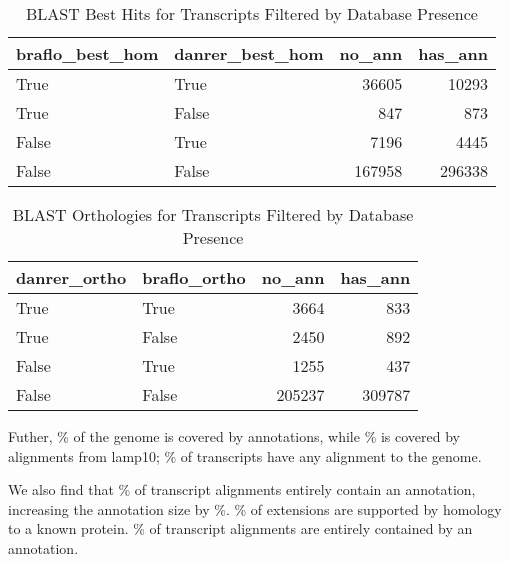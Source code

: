 \documentclass{article}
\begin{document}
\begin{table}[H]
\caption {BLAST Best Hits for Transcripts Filtered by Database Presence}
\begin{center}

\begin{tabular}{llrr}
\toprule
braflo\_best\_hom & danrer\_best\_hom &  no\_ann &  has\_ann \\
\midrule
           True &            True &   36605 &    10293 \\
           True &           False &     847 &      873 \\
          False &            True &    7196 &     4445 \\
          False &           False &  167958 &   296338 \\
\bottomrule
\end{tabular}



\end{center}
\end{table}

\begin{table}[H]
\caption {BLAST Orthologies for Transcripts Filtered by Database Presence}
\begin{center}

\begin{tabular}{llrr}
\toprule
danrer\_ortho & braflo\_ortho &  no\_ann &  has\_ann \\
\midrule
        True &         True &    3664 &      833 \\
        True &        False &    2450 &      892 \\
       False &         True &    1255 &      437 \\
       False &        False &  205237 &   309787 \\
\bottomrule
\end{tabular}



\end{center}
\end{table}


Futher, \% of the genome is covered by annotations, while \% is covered by alignments from lamp10; \% of transcripts have any alignment to the genome.

We also find that \% of transcript alignments entirely contain an annotation, increasing the annotation size by \%. \% of extensions are supported by homology to a known protein. \% of transcript alignments are entirely contained by an annotation.
\end{document}
